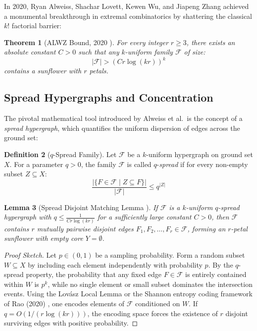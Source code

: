 \documentclass[11pt,a4paper]{article}
\newtheorem{theorem}{Theorem}[section]
\newtheorem{lemma}[theorem]{Lemma}
\theoremstyle{definition}
\newtheorem{definition}[theorem]{Definition}
\begin{document}
In 2020, Ryan Alweiss, Shachar Lovett, Kewen Wu, and Jiapeng Zhang \cite{alweiss2020} achieved a monumental breakthrough in extremal combinatorics by shattering the classical $k!$ factorial barrier:

\begin{theorem}[ALWZ Bound, 2020 \cite{alweiss2020}]\label{thm:alwz}
For every integer $r \ge 3$, there exists an absolute constant $C > 0$ such that any $k$-uniform family $\mathcal{F}$ of size:
\begin{equation}\label{eq:alwz_bound}
|\mathcal{F}| > (C r \log(k r))^k
\end{equation}
contains a sunflower with $r$ petals.
\end{theorem}

\subsection{Spread Hypergraphs and Concentration}

The pivotal mathematical tool introduced by Alweiss et al.\ is the concept of a \emph{spread hypergraph}, which quantifies the uniform dispersion of edges across the ground set:

\begin{definition}[$q$-Spread Family]\label{def:q_spread}
Let $\mathcal{F}$ be a $k$-uniform hypergraph on ground set $X$. For a parameter $q > 0$, the family $\mathcal{F}$ is called $q$-\emph{spread} if for every non-empty subset $Z \subseteq X$:
\begin{equation}\label{eq:q_spread_def}
\frac{|\{F \in \mathcal{F} \mid Z \subseteq F\}|}{|\mathcal{F}|} \le q^{|Z|}
\end{equation}
\end{definition}

\begin{lemma}[Spread Disjoint Matching Lemma \cite{alweiss2020,rao2020}]\label{lem:spread_matching}
If $\mathcal{F}$ is a $k$-uniform $q$-spread hypergraph with $q \le \frac{1}{C r \log(k r)}$ for a sufficiently large constant $C > 0$, then $\mathcal{F}$ contains $r$ mutually pairwise disjoint edges $F_1, F_2, \dots, F_r \in \mathcal{F}$, forming an $r$-petal sunflower with empty core $Y = \emptyset$.
\end{lemma}

\begin{proof}[Proof Sketch]
Let $p \in (0, 1)$ be a sampling probability. Form a random subset $W \subseteq X$ by including each element independently with probability $p$.
By the $q$-spread property, the probability that any fixed edge $F \in \mathcal{F}$ is entirely contained within $W$ is $p^k$, while no single element or small subset dominates the intersection events.
Using the Lov\'asz Local Lemma or the Shannon entropy coding framework of Rao (2020) \cite{rao2020}, one encodes elements of $\mathcal{F}$ conditioned on $W$. If $q = O(1 / (r \log(k r)))$, the encoding space forces the existence of $r$ disjoint surviving edges with positive probability.
\end{proof}
\end{document}
